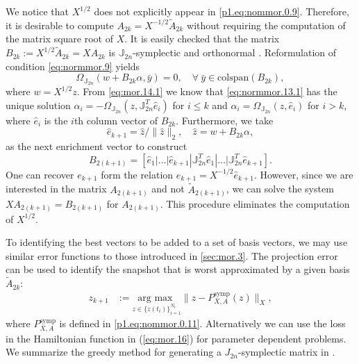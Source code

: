We notice that $X^{1/2}$ does not explicitly appear in \eqref{p1.eq:nommor.0.9}. Therefore, it is desirable to compute $A_{2k} = X^{-1/2} \tilde A_{2k}$ without requiring the computation of the matrix square root of $X$. It is easily checked that the matrix $B_{2k}:=X^{1/2} \tilde A_{2k} = XA_{2k}$ is $\mathbb J_{2n}$-symplectic and orthonormal . Reformulation of condition \cref{eq:normmor.9} yields
\begin{equation} \label{eq:normmor.13.1}
	\Omega_{\mathbb J_{2n}}\left( w + B_{2k} \alpha, \bar y \right) = 0, \quad \forall~ \bar y \in \text{colspan}(B_{2k}),
\end{equation}
where $w = X^{1/2}z$. From \cref{eq:mor.14.1} we know that \cref{eq:normmor.13.1} has the unique solution $\alpha_i = - \Omega_{\mathbb J_{2n}}(z,\mathbb J_{2n}^T \hat e_i)$ for $i\leq k$ and $\alpha_i = \Omega_{\mathbb J_{2n}}(z,\hat e_i)$ for $i>k$, where $\hat e_i$ is the $i$th column vector of $B_{2k}$. Furthermore, we take 
\begin{equation}
	\hat e_{k+1} = \hat z / \| \hat z \|_2, \quad \hat z = w + B_{2k} \alpha,
\end{equation}
as the next enrichment vector to construct
\begin{equation}
	B_{2(k+1)} = [ \hat e_1 | \dots | \hat e_{k+1} | \mathbb J_{2n}^T \hat e_1 | \dots | \mathbb J_{2n}^T \hat e_{k+1} ].
\end{equation}
One can recover $e_{k+1}$ form the relation $e_{k+1} = X^{-1/2} \hat e_{k+1}$. However, since we are interested in the matrix $A_{2(k+1)}$ and not $\tilde A_{2(k+1)}$, we can solve the system $XA_{2(k+1)} = B_{2(k+1)}$ for $A_{2(k+1)}$. This procedure eliminates the computation of $X^{1/2}$.

To identifying the best vectors to be added to a set of basis vectors, we may use similar error functions to those introduced in \cref{sec:mor.3}. The projection error can be used to identify the snapshot that is worst approximated by a given basis $\tilde A_{2k}$:
\begin{equation} \label{eq:normmor.14}
\begin{aligned}
	z_{k+1} &:= \underset{z\in\{ z(t_i)\}_{i=1}^{N_t}}{\text{arg\ max } }\| z - P_{X,A}^{\text{symp}}(z) \|_X,
\end{aligned}
\end{equation}
where $P_{X,A}^{\text{symp}}$ is defined in \eqref{p1.eq:nommor.0.11}. Alternatively we can use the loss in the Hamiltonian function in (\ref{eq:mor.16}) for parameter dependent problems. We summarize the greedy method for generating a $J_{2n}$-symplectic matrix in .

